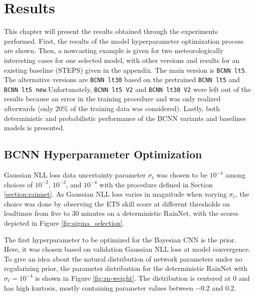 \chapter{Results}
\label{chapter:results}

This chapter will present the results obtained through the experiments performed. First, the results of the model hyperparameter optimization process are shown. Then, a nowcasting example is given for two meteorologically interesting cases for one selected model, with other versions and results for an existing baseline (STEPS) given in the appendix. The main version is \texttt{BCNN lt5}. The alternative versions are \texttt{BCNN lt30} based on the pretrained \texttt{BCNN lt5} and \texttt{BCNN lt5 new}.Unfortunately, \texttt{BCNN lt5 V2} and \texttt{BCNN lt30 V2} were left out of the results because an error in the training procedure and was only realized afterwards (only 20\% of the training data was considered). Lastly, both deterministic and probabilistic performance of the BCNN variants and baselines models is presented. 

\section{BCNN Hyperparameter Optimization}
Gaussian NLL loss data uncertainty parameter $\sigma_\ell$ was chosen to be $10^{-4}$ among choices of $10^{-2}$, $10^{-3}$, and $10^{-4}$ with the procedure defined in Section \ref{section:rainnet}.
As Gaussian NLL loss varies in magnitude when varying $\sigma_\ell$, the choice was done by observing the ETS skill score at different thresholds on leadtimes from five to 30 minutes on a deterministic RainNet, with the scores depicted in Figure \ref{fig:sigma_selection}. %

The first hyperparameter to be optimized for the Bayesian CNN is the prior. Here, it was chosen based on validation Gaussian NLL loss at model convergence. To give an idea about the natural distribution of network parameters under no regularizing prior, the parameter distribution for the deterministic RainNet with $\sigma_\ell = 10^{-4}$ is shown in Figure \ref{fig:rn-weight}. The distribution is centered at 0 and has high kurtosis, mostly containing parameter values between  $-0.2$ and $0.2$. 


